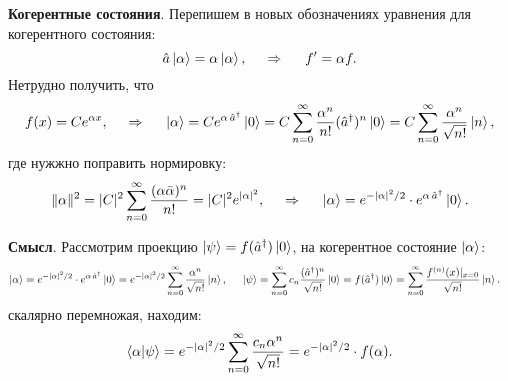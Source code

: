 \textbf{Когерентные состояния}. Перепишем в новых обозначениях уравнения для когерентного состояния:
\begin{equation*}
    \hat{a} \left| \alpha \right\rangle = \alpha \left| \alpha \right\rangle,
    \hspace{0.5cm} \Rightarrow \hspace{0.5cm}
    f' = \alpha f.
\end{equation*}
Нетрудно получить, что
\begin{equation*}
    f(x) = C e^{\alpha x},
    \hspace{0.5cm} \Rightarrow \hspace{0.5cm}
    \left| \alpha \right\rangle = C e^{\alpha\, \hat{a}^{\dag}} \left| 0 \right\rangle = C \sum_{n=0}^{\infty} \frac{\alpha^n}{n!} (\hat{a}^{\dag})^n \left| 0 \right\rangle = C \sum_{n=0}^{\infty} \frac{\alpha^n}{\sqrt{n!}} \left| n \right\rangle,
\end{equation*}
где нужжно поправить нормировку:
\begin{equation*}
    \|\alpha\|^2 = |C|^2 \sum_{n=0}^{\infty} \frac{(\alpha \bar{\alpha})^n}{n!} = |C|^2 e^{|\alpha|^2},
    \hspace{0.5cm} \Rightarrow \hspace{0.5cm}
    \left| \alpha \right\rangle = e^{-|\alpha|^2/2} \cdot e^{\alpha\, \hat{a}^{\dag}} \left| 0 \right\rangle.
\end{equation*}


\textbf{Смысл}. Рассмотрим проекцию $\left| \psi \right\rangle = f(\hat{a}^{\dag}) \left| 0 \right\rangle$, на когерентное состояние $\left| \alpha \right\rangle$:
\begin{align*}
    \left| \alpha \right\rangle = e^{-|\alpha|^2/2} \cdot e^{\alpha\, \hat{a}^{\dag}} \left| 0 \right\rangle = 
     e^{-|\alpha|^2/2} \sum_{n=0}^{\infty} \frac{\alpha^n}{\sqrt{n!}}\left| n \right\rangle,
     \hspace{5 mm} 
     \left| \psi \right\rangle &= \sum_{n=0}^{\infty} c_n \frac{(\hat{a}^{\dag})^n}{\sqrt{n!}} \left| 0 \right\rangle = f(\hat{a}^{\dag}) \left| 0 \right\rangle = \sum_{n=0}^{\infty} \frac{f^{(n)}(x)|_{x=0}}{\sqrt{n!}} \left| n \right\rangle.
\end{align*}
скалярно перемножая, находим:
\begin{equation*}
    \bk{\alpha}{\psi} = e^{-|\alpha|^2/2} \sum_{n=0}^{\infty} \frac{c_n \alpha^n}{\sqrt{n!}} = 
    e^{-|\alpha|^2/2}
    \cdot f(\alpha).
\end{equation*}


